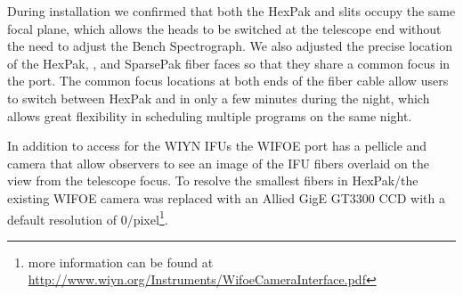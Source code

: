 During installation we confirmed that both the HexPak and \GP slits
occupy the same focal plane, which allows the heads to be switched at
the telescope end without the need to adjust the Bench Spectrograph.
We also adjusted the precise location of the HexPak, \GP, and
SparsePak \citep{Bershady05} fiber faces so that they share a common
focus in the port. The common focus locations at both ends of the
fiber cable allow users to switch between HexPak and \GP in only a few
minutes during the night, which allows great flexibility in scheduling
multiple programs on the same night.

In addition to access for the WIYN IFUs the WIFOE port has a pellicle
and camera that allow observers to see an image of the IFU fibers
overlaid on the view from the telescope focus. To resolve the smallest
fibers in HexPak/\GP the existing WIFOE camera was replaced with an
Allied GigE GT3300 CCD with a default resolution of
0/pixel\footnote{more information can be found at
  \url{http://www.wiyn.org/Instruments/WifoeCameraInterface.pdf}}.
